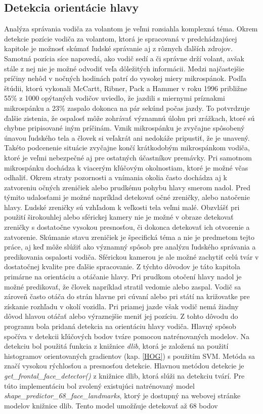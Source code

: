 \documentclass[slovak,master,dept460,male,cpp,cpdeclaration]{diploma}
\begin{document}
\subsection{Detekcia orientácie hlavy}
\label{sec:headOrientation}
Analýza správania vodiča za volantom je  veľmi rozsiahla komplexná téma. Okrem detekcie pozície vodiča za volantom, ktorá je spracovaná v predchádzajúcej kapitole je možnosť skúmať ľudské správanie aj z rôznych ďalších zdrojov. Samotná pozícia  síce napovedá, ako vodič sedí a či správne drží volant, avšak  stále z nej nie je možné odvodiť veľa dôležitých informácii.  Medzi najčastejšie príčiny nehôd v nočných hodinách patrí do vysokej miery mikrospánok. Podľa štúdii\cite{mccartt1996scope}, ktorú vykonali McCartt, Ribner, Pack a Hammer  v roku 1996 približne 55\% z 1000 opýtaných vodičov uviedlo, že jazdili s miernymi príznakmi mikrospánku a 23\% zaspalo dokonca na pár sekúnd počas jazdy. To potvrdzuje ďalšie zistenia, že ospalosť môže zohrávať významnú úlohu pri zrážkach, ktoré sú chybne pripisované iným príčinám. Vznik mikrospánku je zvyčajne spôsobený únavou ľudského tela  a človek si veľakrát ani nedokáže pripustiť, že je unavený. Takéto podcenenie situácie zvyčajne končí krátkodobým mikrospánkom  vodiča, ktoré je  veľmi nebezpečné aj pre ostatných účastníkov premávky.  Pri samotnom mikrospánku dochádza  k viacerým kľúčovým okolnostiam, ktoré je možné včas odhaliť. Okrem straty pozornosti a vnímania okolia často dochádza aj k zatvoreniu očných zreničiek alebo prudkému pohybu hlavy smerom nadol. Pred týmito udalosťami je možné napríklad detekovať  očné zreničky, alebo natočenie hlavy. Ľudské zreničky sú vzhľadom  k veľkosti tela veľmi malé. Obzvlášť pri použití širokouhlej alebo sférickej kamery nie je možné v obraze detekovať  zreničky s dostatočne vysokou presnosťou, či dokonca detekovať ich otvorenie a zatvorenie.  Skúmanie stavu zreničiek je špecifická téma a nie je predmetom tejto práce, aj keď môže slúžiť ako významný spôsob pre analýzu ľudského správania  a predikovania ospalosti vodiča. Sférickou kamerou je ale možné  zachytiť celú tvár v dostatočnej kvalite pre ďalšie spracovanie. Z týchto dôvodov je  táto kapitola  primárne na orientáciu a otáčanie hlavy. Pri prudkom otočení hlavy nadol je možné predikovať, že človek napríklad stratil vedomie alebo zaspal. Vodič sa zároveň často otáča do strán  hlavne pri cúvaní alebo pri  státí na križovatke pre získanie rozhľadu v okolí vozidla.  Pri priamej jazde však vodič nemá žiadny dôvod hlavou otáčať alebo výraznejšie meniť jej pozíciu. Z tohto dôvodu  do programu  bola pridaná detekcia na orientáciu hlavy vodiča. Hlavný spôsob spočíva v detekcii  kľúčových bodov tváre pomocou natrénovaných modelov. Na detekciu bol použitá funkcia z knižnice \textit{dlib}, ktorá je založená na použití histogramov orientovaných gradientov (kap. \ref{HOG}) s použitím SVM. Metóda sa značí vysokou rýchlosťou a presnosťou detekcie.  Hlavnou metódou detekcie je \textit{get\_frontal\_face\_detector()} z knižnice dlib, ktorá slúži na detekciu tvárí. Pre túto implementáciu bol zvolený existujúci natrénovaný model \textit{shape\_predictor\_68\_face\_landmarks}, ktorý je dostupný na webovej stránke modelov knižnice dlib\cite{dlibModel}. Tento model umožňuje detekovať až 68 bodov 
\end{document}
